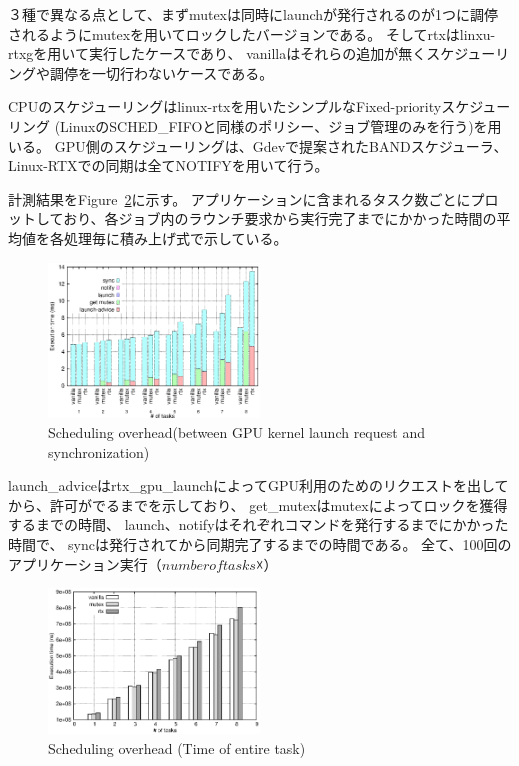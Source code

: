 ３種で異なる点として、まずmutexは同時にlaunchが発行されるのが1つに調停されるようにmutexを用いてロックしたバージョンである。
そしてrtxはlinxu-rtxgを用いて実行したケースであり、
vanillaはそれらの追加が無くスケジューリングや調停を一切行わないケースである。

CPUのスケジューリングはlinux-rtxを用いたシンプルなFixed-priorityスケジューリング (LinuxのSCHED\_FIFOと同様のポリシー、ジョブ管理のみを行う)を用いる。
GPU側のスケジューリングは、Gdevで提案されたBANDスケジューラ、Linux-RTXでの同期は全てNOTIFYを用いて行う。

計測結果をFigure~\ref{fig:fp_overhead}に示す。
アプリケーションに含まれるタスク数ごとにプロットしており、各ジョブ内のラウンチ要求から実行完了までにかかった時間の平均値を各処理毎に積み上げ式で示している。


\begin{figure}[t]
\begin{center}
\includegraphics[width=0.5\textwidth]{img/sum_task_fp.eps}
\caption{Scheduling overhead(between GPU kernel launch request and synchronization)}
\end{center}
\label{fig:fp_overhead}
\end{figure}


launch\_adviceはrtx\_gpu\_launchによってGPU利用のためのリクエストを出してから、許可がでるまでを示しており、
get\_mutexはmutexによってロックを獲得するまでの時間、
launch、notifyはそれぞれコマンドを発行するまでにかかった時間で、
syncは発行されてから同期完了するまでの時間である。
全て、100回のアプリケーション実行（$number of tasks ☓$）

\begin{figure}[t]
\begin{center}
\includegraphics[width=0.5\textwidth]{img/sum_task.eps}
\caption{Scheduling overhead (Time of entire task)}
\end{center}
\label{fig:fp_overhead}
\end{figure}


